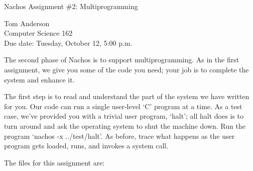 


\begin{center}
{\large Nachos Assignment \#2: Multiprogramming

\vspace{.2in}
Tom Anderson\\
Computer Science 162\\
Due date: Tuesday, October 12, 5:00 p.m.
}
\end{center}

\vspace{.2in}

The second phase of Nachos is to support multiprogramming.
As in the first assignment, we give you some of the code
you need; your job is to complete the system and enhance it.

The first step is to read and understand the part of the system
we have written for you.  Our code can run a single user-level `C'
program at a time.  As a test case, we've provided you with 
a trivial user program, `halt'; all halt does is to turn around
and ask the operating system to shut the 
machine down.  Run the program `nachos -x ../test/halt'.
As before, trace what happens as the user program
gets loaded, runs, and invokes a system call.

The files for this assignment are:

